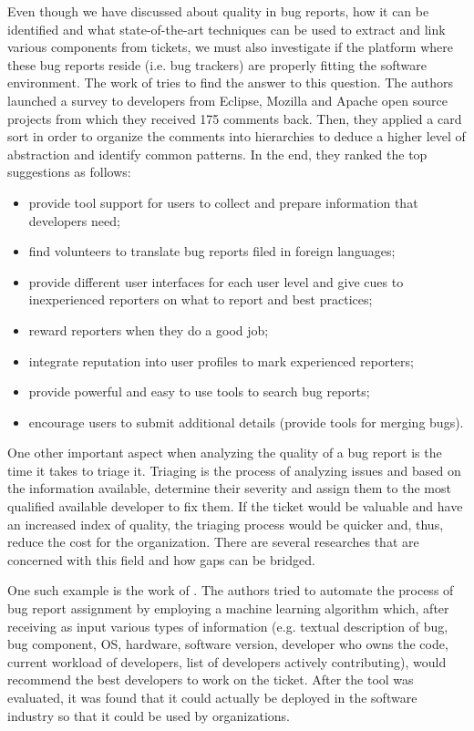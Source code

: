 \documentclass{mprop}
\begin{document}
Even though we have discussed about quality in bug reports, how it can be 
identified and what state-of-the-art techniques can be used to extract and 
link various components from tickets, we must also investigate if the platform 
where these bug reports 
reside (i.e. bug trackers) are properly fitting the software environment. 
The work of \citet{just2008towards} tries to find the answer to this question.
The authors launched a survey to developers from Eclipse, Mozilla and Apache
open source projects from which they received 175 comments back. Then, they
applied a card sort in order to organize the comments into hierarchies to 
deduce a higher level of abstraction and identify common patterns. In the end,
they ranked the top suggestions as follows:
  \begin{itemize}
    \item provide tool support for users to collect and prepare information that 
      developers need;
    \item find volunteers to translate bug reports filed in foreign languages;
    \item provide different user interfaces for each user level and give cues to 
      inexperienced reporters on what to report and best practices;
    \item reward reporters when they do a good job;
    \item integrate reputation into user profiles to mark experienced reporters;
    \item provide powerful and easy to use tools to search bug reports;
    \item encourage users to submit additional details (provide tools for merging 
      bugs).
  \end{itemize}

One other important aspect when analyzing the quality of a bug report is the
time it takes to triage it. Triaging is the process of analyzing issues and 
based on the information available, determine their severity and assign them to the
most qualified available developer to fix them. If the ticket would be valuable
and have an increased index of quality, the triaging process would be quicker and,
thus, reduce the cost for the organization. There are several researches that 
are concerned with this field and how gaps can be bridged.

One such example is the work of \citet{anvik2006automating}. The authors tried
to automate the process of bug report assignment by employing a machine learning 
algorithm which, after receiving as input various types of information (e.g. 
textual description of bug, bug component, OS, hardware, software version, 
developer who owns the code, current workload of developers, list of developers 
actively contributing), would recommend the best developers to work on the ticket. 
After the tool was evaluated, it was found that it could actually be deployed
in the software industry so that it could be used by organizations.
\end{document}
